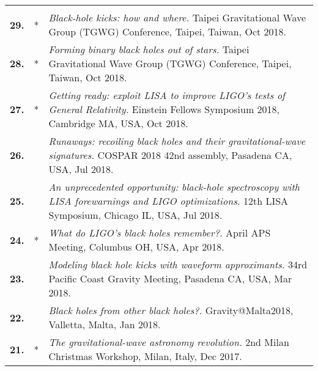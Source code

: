{\begin{longtable}{rp{0.3cm}p{15.8cm}}
\vspace{0.05cm}\\
%
\textbf{29.} & * & \textit{Black-hole kicks: how and where.}
\newline{}
 Taipei Gravitational Wave Group (TGWG) Conference, Taipei, Taiwan, Oct 2018.
\vspace{0.05cm}\\
%
\textbf{28.} & * & \textit{Forming binary black holes out of stars.}
\newline{}
 Taipei Gravitational Wave Group (TGWG) Conference, Taipei, Taiwan, Oct 2018.
\vspace{0.05cm}\\
%
\textbf{27.} & * & \textit{Getting ready: exploit LISA to improve LIGO's tests of General Relativity.}
\newline{}
 Einstein Fellows Symposium 2018, Cambridge MA, USA, Oct 2018.
\vspace{0.05cm}\\
%
\textbf{26.} &  & \textit{Runaways: recoiling black holes and their gravitational-wave signatures.}
\newline{}
 COSPAR 2018 42nd assembly, Pasadena CA, USA, Jul 2018.
\vspace{0.05cm}\\
%
\textbf{25.} &  & \textit{An unprecedented opportunity: black-hole spectroscopy with LISA forewarnings and LIGO optimizations.}
\newline{}
 12th LISA Symposium, Chicago IL, USA, Jul 2018.
\vspace{0.05cm}\\
%
\textbf{24.} & * & \textit{What do LIGO's black holes remember?.}
\newline{}
 April APS Meeting, Columbus OH, USA, Apr 2018.
\vspace{0.05cm}\\
%
\textbf{23.} &  & \textit{Modeling black hole kicks with waveform approximants.}
\newline{}
 34rd Pacific Coast Gravity Meeting, Pasadena CA, USA, Mar 2018.
\vspace{0.05cm}\\
%
\textbf{22.} &  & \textit{Black holes from other black holes?.}
\newline{}
 Gravity@Malta2018, Valletta, Malta, Jan 2018.
\vspace{0.05cm}\\
%
\textbf{21.} & * & \textit{The gravitational-wave astronomy revolution.}
\newline{}
 2nd Milan Christmas Workshop, Milan, Italy, Dec 2017.

\end{longtable}}

